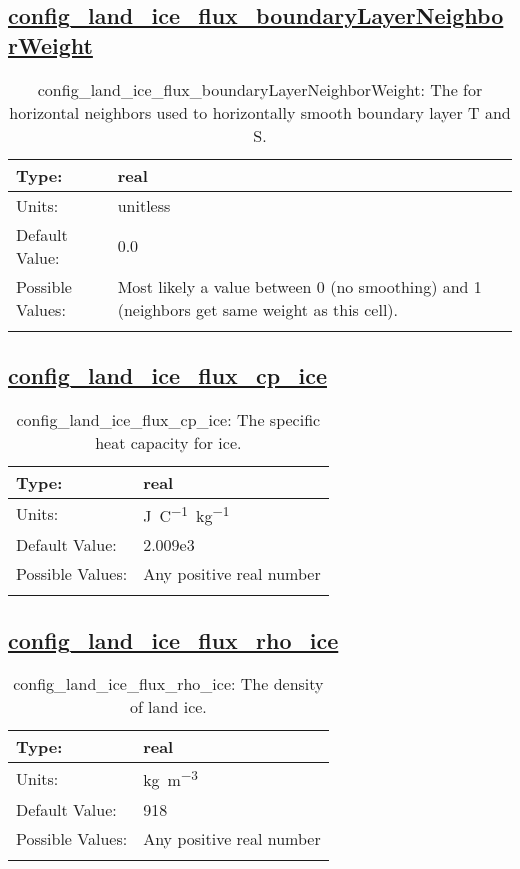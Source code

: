 \subsection[config\_land\_ice\_flux\_boundaryLayerNeighborWeight]{\hyperref[sec:nm_tab_land_ice_fluxes]{config\_land\_ice\_flux\_boundaryLayerNeighborWeight}}
\label{subsec:nm_sec_config_land_ice_flux_boundaryLayerNeighborWeight}
\begin{center}
\begin{longtable}{| p{2.0in} || p{4.0in} |}
    \hline
    Type: & real \\
    \hline
    Units: & \si{unitless} \\
    \hline
    Default Value: & 0.0 \\
    \hline
    Possible Values: & Most likely a value between 0 (no smoothing) and 1 (neighbors get same weight as this cell). \\
    \hline
    \caption{config\_land\_ice\_flux\_boundaryLayerNeighborWeight: The for horizontal neighbors used to horizontally smooth boundary layer T and S.}
\end{longtable}
\end{center}
\subsection[config\_land\_ice\_flux\_cp\_ice]{\hyperref[sec:nm_tab_land_ice_fluxes]{config\_land\_ice\_flux\_cp\_ice}}
\label{subsec:nm_sec_config_land_ice_flux_cp_ice}
\begin{center}
\begin{longtable}{| p{2.0in} || p{4.0in} |}
    \hline
    Type: & real \\
    \hline
    Units: & \si{J.C^{-1}.kg^{-1}} \\
    \hline
    Default Value: & 2.009e3 \\
    \hline
    Possible Values: & Any positive real number \\
    \hline
    \caption{config\_land\_ice\_flux\_cp\_ice: The specific heat capacity for ice.}
\end{longtable}
\end{center}
\subsection[config\_land\_ice\_flux\_rho\_ice]{\hyperref[sec:nm_tab_land_ice_fluxes]{config\_land\_ice\_flux\_rho\_ice}}
\label{subsec:nm_sec_config_land_ice_flux_rho_ice}
\begin{center}
\begin{longtable}{| p{2.0in} || p{4.0in} |}
    \hline
    Type: & real \\
    \hline
    Units: & \si{kg.m^{-3}} \\
    \hline
    Default Value: & 918 \\
    \hline
    Possible Values: & Any positive real number \\
    \hline
    \caption{config\_land\_ice\_flux\_rho\_ice: The density of land ice.}
\end{longtable}
\end{center}
